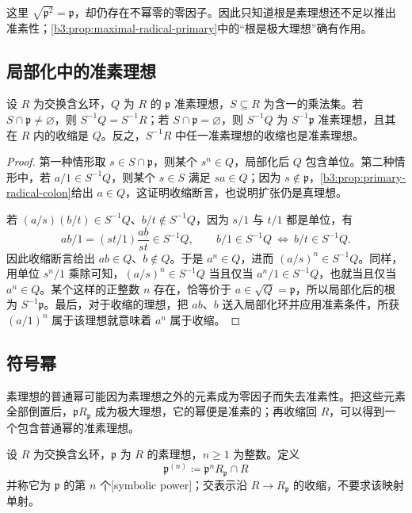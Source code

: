这里 \(\sqrt{\mathfrak p^2}=\mathfrak p\)，却仍存在不幂零的零因子。因此只知道根是素理想还不足以推出准素性；\cref{b3:prop:maximal-radical-primary}中的“根是极大理想”确有作用。

\subsection{局部化中的准素理想}
\label{b3:subsec:0402:03}

\begin{proposition}\label{b3:prop:primary-localization}
	设 \(R\) 为交换含幺环，\(Q\) 为 \(R\) 的 \(\mathfrak p\) 准素理想，\(S\subseteq R\) 为含一的乘法集。若 \(S\cap\mathfrak p\ne\varnothing\)，则 \(S^{-1}Q=S^{-1}R\)；若 \(S\cap\mathfrak p=\varnothing\)，则 \(S^{-1}Q\) 为 \(S^{-1}\mathfrak p\) 准素理想，且其在 \(R\) 内的收缩是 \(Q\)。反之，\(S^{-1}R\) 中任一准素理想的收缩也是准素理想。
\end{proposition}
\begin{proof}
	第一种情形取 \(s\in S\cap\mathfrak p\)，则某个 \(s^n\in Q\)，局部化后 \(Q\) 包含单位。第二种情形中，若 \(a/1\in S^{-1}Q\)，则某个 \(s\in S\) 满足 \(sa\in Q\)；因为 \(s\notin\mathfrak p\)，\cref{b3:prop:primary-radical-colon}给出 \(a\in Q\)，这证明收缩断言，也说明扩张仍是真理想。

	若 \((a/s)(b/t)\in S^{-1}Q\)、\(b/t\notin S^{-1}Q\)，因为 \(s/1\) 与 \(t/1\) 都是单位，有
	\[
		ab/1=(st/1)\frac{ab}{st}\in S^{-1}Q, \qquad b/1\in S^{-1}Q\ \Longleftrightarrow\ b/t\in S^{-1}Q.
	\]
	因此收缩断言给出 \(ab\in Q\)、\(b\notin Q\)。于是 \(a^n\in Q\)，进而 \((a/s)^n\in S^{-1}Q\)。同样，用单位 \(s^n/1\) 乘除可知，\((a/s)^n\in S^{-1}Q\) 当且仅当 \(a^n/1\in S^{-1}Q\)，也就当且仅当 \(a^n\in Q\)。某个这样的正整数 \(n\) 存在，恰等价于 \(a\in\sqrt Q=\mathfrak p\)，所以局部化后的根为 \(S^{-1}\mathfrak p\)。最后，对于收缩的理想，把 \(ab\)、\(b\) 送入局部化环并应用准素条件，所获 \((a/1)^n\) 属于该理想就意味着 \(a^n\) 属于收缩。
\end{proof}

\subsection{符号幂}
\label{b3:subsec:0402:04}

素理想的普通幂可能因为素理想之外的元素成为零因子而失去准素性。把这些元素全部倒置后，\(\mathfrak pR_{\mathfrak p}\) 成为极大理想，它的幂便是准素的；再收缩回 \(R\)，可以得到一个包含普通幂的准素理想。

\begin{definition}\label{b3:def:symbolic-power}
	设 \(R\) 为交换含幺环，\(\mathfrak p\) 为 \(R\) 的素理想，\(n\ge1\) 为整数。定义
	\[
		\mathfrak p^{(n)}\coloneqq\mathfrak p^nR_{\mathfrak p}\cap R
	\]
	并称它为 \(\mathfrak p\) 的第 \(n\) 个[symbolic power]；交表示沿 \(R\rightarrow R_{\mathfrak p}\) 的收缩，不要求该映射单射。
\end{definition}

